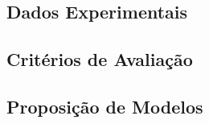 \subsection{Dados Experimentais}


\subsection{Critérios de Avaliação}


\subsection{Proposição de Modelos}

